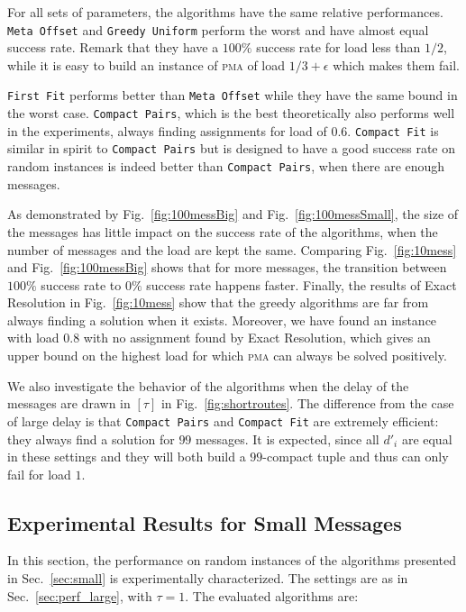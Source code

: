 \documentclass[a4paper,UKenglish,cleveref, autoref, thm-restate]{lipics-v2019}
\newcommand\pma{\textsc{pma}\xspace}
\newcommand\firstfit{\texttt{First Fit}\xspace}
\newcommand\compactpair{\texttt{Compact Pairs}\xspace}
\newcommand\metaoffset{\texttt{Meta Offset}\xspace}
\newcommand\greedyuniform{\texttt{Greedy Uniform}\xspace}
\newcommand\compactfit{\texttt{Compact Fit}\xspace}
\begin{document}
\medskip

For all sets of parameters, the algorithms have the same relative performances. \metaoffset and \greedyuniform
perform the worst and have almost equal success rate. Remark that they have a $100\%$ success rate for load
less than $1/2$, while it is easy to build an instance of \pma of load $1/3 +\epsilon$ which makes them fail. 

\firstfit performs better than \metaoffset while they have the same bound in the worst case. \compactpair, which is the best theoretically also performs well in the experiments, always finding assignments for load of $0.6$. \compactfit is similar in spirit to \compactpair but is designed to have a good success rate on random instances is indeed better than \compactpair, when there are enough messages.

As demonstrated by Fig.~\ref{fig:100messBig} and Fig.~\ref{fig:100messSmall}, the size of the messages has little impact on the success rate of the algorithms, when the number of messages and the load are kept the same. Comparing Fig.~\ref{fig:10mess} and Fig.~\ref{fig:100messBig} shows that for more messages, the transition between $100\%$ success rate to $0\%$ success rate happens faster.
Finally, the results of Exact Resolution in Fig.~\ref{fig:10mess} show that the greedy algorithms are far from always finding a solution when it exists. Moreover, we have found an instance with load $0.8$ with no assignment found by Exact Resolution, which gives an upper bound on the highest load for which \pma can always be solved positively.

We also investigate the behavior of the algorithms when the delay of the messages are drawn in $[\tau]$ in Fig.~\ref{fig:shortroutes}. The difference from the case of large delay is that \compactpair and \compactfit are extremely efficient: they always find a solution for $99$ messages. It is expected, since all $d'_i$ are equal in these settings and they will both build a $99$-compact tuple and thus can only fail for load $1$.

\subsection{Experimental Results for Small Messages} \label{sec:perf_small}


In this section, the performance on random instances of the algorithms presented in Sec.~\ref{sec:small} is experimentally characterized. The settings are as in Sec.~\ref{sec:perf_large}, with $\tau = 1$. The evaluated algorithms are:
\end{document}
